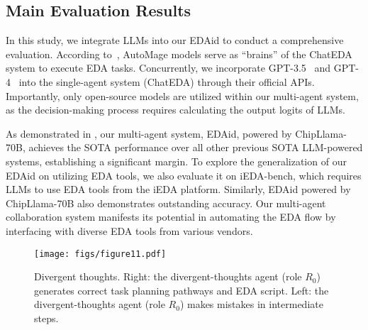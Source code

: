 \subsection{Main Evaluation Results}
In this study, we integrate LLMs into our EDAid to conduct a comprehensive evaluation. 
According to~\cite{wu2024chateda}, AutoMage models serve as ``brains'' of the ChatEDA system to execute EDA tasks. 
Concurrently, we incorporate GPT-3.5~\cite{brown2020gpt3} and GPT-4~\cite{openai2023gpt4} into the single-agent system (ChatEDA) through their official APIs.
Importantly, only open-source models are utilized within our multi-agent system, as the decision-making process requires calculating the output logits of LLMs.

As demonstrated in , our multi-agent system, EDAid, powered by ChipLlama-70B, achieves the SOTA performance over all other previous SOTA LLM-powered systems, establishing a significant margin.
To explore the generalization of our EDAid on utilizing EDA tools, we also evaluate it on iEDA-bench, which requires LLMs to use EDA tools from the iEDA platform.
Similarly, EDAid powered by ChipLlama-70B also demonstrates outstanding accuracy.
Our multi-agent collaboration system manifests its potential in automating the EDA flow by interfacing with diverse EDA tools from various vendors.

\begin{figure*}[tb!]
    \centering
    \texttt{[image: figs/figure11.pdf]} 
    \caption{Divergent thoughts. Right: the divergent-thoughts agent (role $R_{0}$) generates correct task planning pathways and EDA script. Left: the divergent-thoughts agent (role $R_{0}$) makes mistakes in intermediate steps.}
    \label{fig:cases1}
\end{figure*}

\begin{table}[!t]
\centering
\setlength\tabcolsep{2.4pt}
\caption{Ablation study on hybrid instruction tuning.}
\label{table:ab-hybrid}
\end{table}

